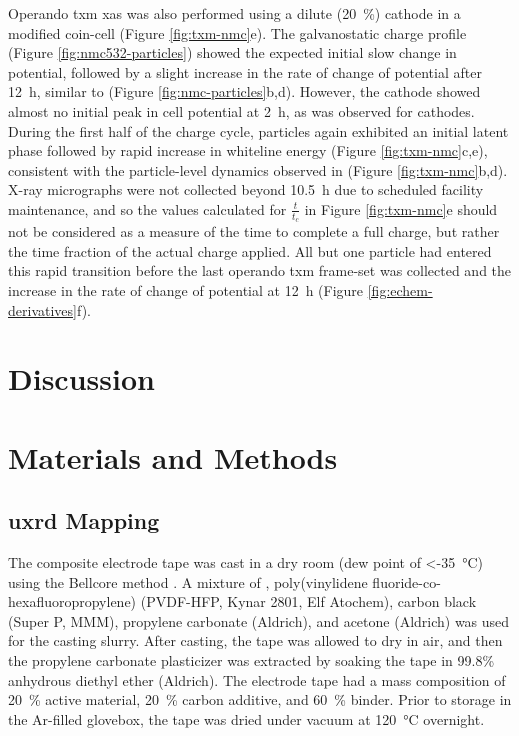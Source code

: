 \documentclass{article}
\begin{document}
Operando \gls{txm} \gls{xas} was also performed using a dilute
(\SI{20}{\percent}) \nmc[532]{} cathode in a modified coin-cell
(Figure \ref{fig:txm-nmc}e). The galvanostatic charge profile (Figure
\ref{fig:nmc532-particles}) showed the expected initial slow change in
potential, followed by a slight increase in the rate of change of
potential after \SI{12}{\hour}, similar to \nmc[333]{} (Figure
\ref{fig:nmc-particles}b,d). However, the \nmc[532]{} cathode showed
almost no initial peak in cell potential at \SI{2}{\hour}, as was
observed for \nmc[333]{} cathodes. During the first half of the charge
cycle, particles again exhibited an initial latent phase followed by
rapid increase in whiteline energy (Figure \ref{fig:txm-nmc}c,e),
consistent with the particle-level dynamics observed in \nmc[333]{}
(Figure \ref{fig:txm-nmc}b,d). X-ray micrographs were not collected
beyond \SI{10.5}{\hour} due to scheduled facility maintenance, and so
the values calculated for $\frac{t}{t_c}$ in Figure \ref{fig:txm-nmc}e
should not be considered as a measure of the time to complete a full
charge, but rather the time fraction of the actual charge applied. All
but one particle had entered this rapid transition before the last
operando \gls{txm} frame-set was collected and the increase in the
rate of change of potential at \SI{12}{\hour} (Figure
\ref{fig:echem-derivatives}f).



\section{Discussion}

\section{Materials and Methods}

\subsection{\gls{uxrd} Mapping}

The \nca{} composite electrode tape was cast in a dry room (dew point
of \SI{<-35}{\celsius}) using the Bellcore method
\cite{Tarascon1996}. A mixture of \nca{}, poly(vinylidene
fluoride-co-hexafluoropropylene) (PVDF-HFP, Kynar 2801, Elf Atochem),
carbon black (Super P, MMM), propylene carbonate (Aldrich), and
acetone (Aldrich) was used for the casting slurry. After casting, the
tape was allowed to dry in air, and then the propylene carbonate
plasticizer was extracted by soaking the tape in 99.8\% anhydrous
diethyl ether (Aldrich). The electrode tape had a mass composition of
\SI{20}{\percent} active material, \SI{20}{\percent} carbon additive,
and \SI{60}{\percent} binder. Prior to storage in the Ar-filled
glovebox, the tape was dried under vacuum at \SI{120}{\celsius}
overnight.
\end{document}
